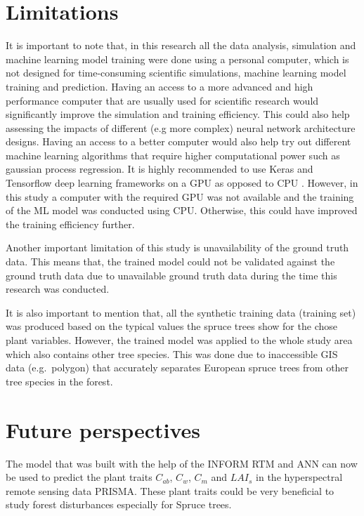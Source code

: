 \documentclass[a4paper, twoside]{templates/ociamthesis}
\begin{document}
\hypertarget{limitations}{%
\section{Limitations}\label{limitations}}

It is important to note that, in this research all the data analysis, simulation and machine learning model training were done using a personal computer, which is not designed for time-consuming scientific simulations, machine learning model training and prediction. Having an access to a more advanced and high performance computer that are usually used for scientific research would significantly improve the simulation and training efficiency. This could also help assessing the impacts of different (e.g more complex) neural network architecture designs. Having an access to a better computer would also help try out different machine learning algorithms that require higher computational power such as gaussian process regression. It is highly recommended to use Keras and Tensorflow deep learning frameworks on a GPU as opposed to CPU \citep{allaire2018deep}. However, in this study a computer with the required GPU was not available and the training of the ML model was conducted using CPU. Otherwise, this could have improved the training efficiency further.

Another important limitation of this study is unavailability of the ground truth data. This means that, the trained model could not be validated against the ground truth data due to unavailable ground truth data during the time this research was conducted.

It is also important to mention that, all the synthetic training data (training set) was produced based on the typical values the spruce trees show for the chose plant variables. However, the trained model was applied to the whole study area which also contains other tree species. This was done due to inaccessible GIS data (e.g.~polygon) that accurately separates European spruce trees from other tree species in the forest.

\hypertarget{future-perspectives}{%
\section{Future perspectives}\label{future-perspectives}}

The model that was built with the help of the INFORM RTM and ANN can now be used to predict the plant traits \(C_{ab}\), \(C_{w}\), \(C_{m}\) and \(LAI_{s}\) in the hyperspectral remote sensing data PRISMA. These plant traits could be very beneficial to study forest disturbances especially for Spruce trees.
\end{document}
